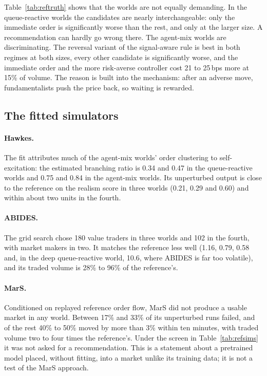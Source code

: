 

Table~\ref{tab:reftruth} shows that the worlds are not equally demanding. In the queue-reactive worlds the candidates are nearly interchangeable: only the immediate order is significantly worse than the rest, and only at the larger size. A recommendation can hardly go wrong there. The agent-mix worlds are discriminating. The reversal variant of the signal-aware rule is best in both regimes at both sizes, every other candidate is significantly worse, and the immediate order and the more risk-averse controller cost 21 to 25\,bps more at 15\% of volume. The reason is built into the mechanism: after an adverse move, fundamentalists push the price back, so waiting is rewarded.

\subsection{The fitted simulators}



\paragraph{Hawkes.} The fit attributes much of the agent-mix worlds' order clustering to self-excitation: the estimated branching ratio is 0.34 and 0.47 in the queue-reactive worlds and 0.75 and 0.84 in the agent-mix worlds. Its unperturbed output is close to the reference on the realism score in three worlds (0.21, 0.29 and 0.60) and within about two units in the fourth.

\paragraph{ABIDES.} The grid search chose 180 value traders in three worlds and 102 in the fourth, with market makers in two. It matches the reference less well (1.16, 0.79, 0.58 and, in the deep queue-reactive world, 10.6, where ABIDES is far too volatile), and its traded volume is 28\% to 96\% of the reference's.

\paragraph{MarS.} Conditioned on replayed reference order flow, MarS did not produce a usable market in any world. Between 17\% and 33\% of its unperturbed runs failed, and of the rest 40\% to 50\% moved by more than 3\% within ten minutes, with traded volume two to four times the reference's. Under the screen in Table~\ref{tab:refsims} it was not asked for a recommendation. This is a statement about a pretrained model placed, without fitting, into a market unlike its training data; it is not a test of the MarS approach.

